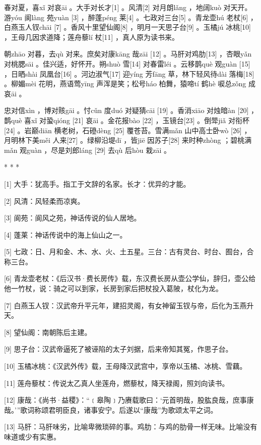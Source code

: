\documentclass[12pt,UTF8]{ctexbook}
\begin{document}
春对夏，喜xǐ 对哀āi 。大手对长才[1] 。风清[2] 对月朗lǎng ，地阔kuò 对天开。游yóu 阆làng 苑yuàn [3] ，醉蓬péng 莱[4] 。七政对三台[5] 。青龙壶hú 老杖[6] ，白燕玉人钗chāi [7] 。香风十里望仙阁[8] ，明月一天思子台[9] 。玉橘jú 冰桃[10] ，王母几因求道降；莲舟藜lí 杖[11] ，真人原为读书来。

朝zhāo 对暮，去qù 对来。庶矣对康kāng 哉zāi [12] 。马肝对鸡肋[13] ，杏眼yǎn 对桃腮sāi 。佳兴适，好怀开。朔shuò 雪[14] 对春雷léi 。云移鹊què 观guàn [15] ，日晒shài 凤凰台[16] 。河边淑气[17] 迎yíng 芳fāng 草，林下轻风待dài 落梅[18] 。柳媚mèi 花明，燕语莺yīng 声浑是笑；松号háo 柏舞，猿啼tí 鹤hè 唳总zǒng 成哀āi 。

忠对信xìn ，博对赅gāi 。忖cǔn 度duó 对疑猜cāi [19] 。香消xiāo 对烛暗àn [20] ，鹊què 喜xǐ 对蛩qióng [21] 哀āi 。金花报bào [22] ，玉镜台[23] 。倒斝jiǎ 对衔杯[24] 。岩巅diān 横老树，石磴dèng [25] 覆苍苔。雪满mǎn 山中高士卧wò [26] ，月明林下美měi 人来[27] 。绿柳沿堤dī ，皆jiē 因苏子[28] 来时种zhòng ；碧桃满mǎn 观guàn ，尽是刘郎láng [29] 去qù 后hòu 栽zāi 。



* * *



[1] 大手：犹高手。指工于文辞的名家。长才：优异的才能。

[2] 风清：风轻柔而凉爽。

[3] 阆苑：阆风之苑，神话传说的仙人居地。

[4] 蓬莱：神话传说中的海上仙山之一。

[5] 七政：日、月和金、木、水、火、土五星。三台：古有灵台、时台、囿台，合称三台。

[6] 青龙壶老杖：《后汉书·费长房传》载，东汉费长房从壶公学仙，辞归，壶公给他一竹杖，说：骑之可以到家，长房到家后把杖投入葛陂，杖化为龙。

[7] 白燕玉人钗：汉武帝升平元年，建招灵阁，有女神留玉钗与帝，后化为玉燕升天。

[8] 望仙阁：南朝陈后主建。

[9] 思子台：汉武帝逼死了被诬陷的太子刘据，后来帝知其冤，作思子台。

[10] 玉橘冰桃：《汉武外传》载，王母降汉武宫中，享帝以玉橘、冰桃、雪藕。

[11] 莲舟藜杖：传说太乙真人坐莲舟，燃藜杖，降天禄阁，照刘向读书。

[12] 康哉：《尚书·益稷》：“﹝皋陶﹞乃赓载歌曰：‘元首明哉，股肱良哉，庶事康哉。’”歌词称颂君明臣良，诸事安宁。后遂以“康哉”为歌颂太平之词。

[13] 马肝：马肝味劣，比喻卑微琐碎的事。鸡肋：与鸡的肋骨一样无味。比喻没有味道或少有实惠。
\end{document}
